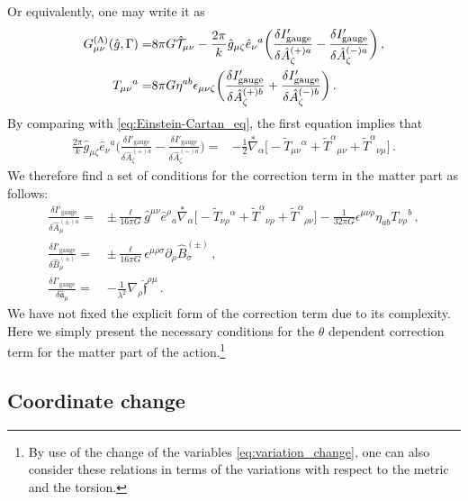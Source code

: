\documentclass[11pt]{article}
\numberwithin{equation}{section}
\begin{document}
Or equivalently, one may write it as
\begin{align}
  G^{(\Lambda)}_{\mu\nu}(\hat{g},\Gamma) =&
8\pi G \hat{{\cal T}}_{\mu\nu}
-\frac{2\pi}{k} \hat{g}_{\mu\zeta} \hat{e}_\nu{}^a
\bigg(
\frac{\delta I'_\text{gauge}}{\delta \hat{A}_\zeta^{(+)a}}
-
\frac{\delta I'_\text{gauge}}{\delta \hat{A}_\zeta^{(-)a}} \bigg) \,,\\
T_{\mu\nu}{}^a=& 8\pi G \eta^{ab} \epsilon_{\mu\nu\zeta}
\bigg(
\frac{\delta I'_\text{gauge}}{\delta \hat{A}_\zeta^{(+)b}}
+
\frac{\delta I'_\text{gauge}}{\delta \hat{A}_\zeta^{(-)b}} \bigg) \,.
\end{align}
By comparing with \eqref{eq:Einstein-Cartan_eq}, the first equation implies that
\begin{align}
\frac{2\pi}{k} \hat{g}_{\mu\zeta} \hat{e}_\nu{}^a
\bigg(
\frac{\delta I'_\text{gauge}}{\delta \hat{A}_\zeta^{(+)a}}
-
\frac{\delta I'_\text{gauge}}{\delta \hat{A}_\zeta^{(-)a}} \bigg)
=&
-\frac{1}{2}  \overset{*}{\nabla}_\alpha
\big[- \tilde{T}_{\mu\nu}{}^\alpha+\tilde{T}^\alpha{}_{\mu\nu}+\tilde{T}^\alpha{}_{\nu\mu} \big]
\,.
\end{align}
We therefore find a set of conditions for the correction term in the matter part as follows:
\begin{align}
  \frac{\delta I'_\text{gauge}}{\delta \hat{A}_\mu^{(\pm)a}} =&
\pm \frac{\ell}{16 \pi G} \hat{g}^{\mu\nu} \hat{e}^\rho{}_a
\overset{*}{\nabla}_\alpha
\big[- \tilde{T}_{\nu\rho}{}^\alpha+\tilde{T}^\alpha{}_{\nu\rho}+\tilde{T}^\alpha{}_{\rho\nu} \big]
-\frac{1}{32\pi G}\epsilon^{\mu\nu\rho} \eta_{ab} T_{\nu\rho}{}^b \,,\\
\frac{\delta {I}'_\text{gauge}}{\delta \hat{B}_\mu^{(\pm)}}
=& \pm \frac{\ell}{16\pi G} \epsilon^{\mu\rho\sigma}  \partial_\rho \hat{B}_\sigma^{(\pm)} \,,
\label{eq:I_matter_B_cond}\\
\frac{\delta {I}'_\text{gauge}}{\delta \hat{\mathfrak{a}}_\mu}
=& -\frac{1}{\lambda^2} \nabla_\rho \hat{\mathfrak{f}}^{\rho\mu}  \,.
\end{align}
We have not fixed the explicit form of the correction term due to its complexity.
Here we simply present the necessary conditions for the $\theta$ dependent correction term
for the matter part of the action.\footnote{%
By use of the change of the variables \eqref{eq:variation_change}, one can also consider
these relations in terms of the variations with respect to the metric and the torsion.}


\subsection{Coordinate change}
\label{sec:coordinate-change}
\end{document}
